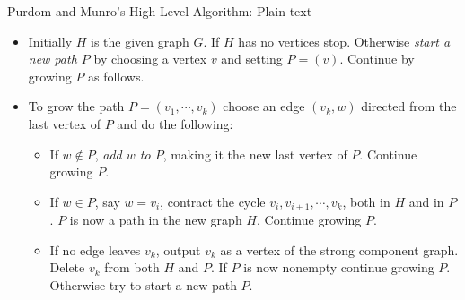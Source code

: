 \documentclass{beamer}
\begin{document}
\begin{frame}{Purdom and Munro's High-Level Algorithm: Plain text}
	\begin{itemize}
		\item
		Initially $H$ is the given graph $G$. If $H$ has no vertices stop. Otherwise \emph{start a new path $P$}
		by choosing a vertex $v$ and setting $P=(v)$. Continue by growing $P$ as follows.
		\item
		To grow the path $P=(v_1,\cdots ,v_k)$ choose an edge $(v_k,w)$ directed from the last
		vertex of $P$ and do the following:
		\begin{itemize}
			\item
			If $w\notin P$, \emph{add $w$ to $P$}, making it the new last vertex of $P$. Continue growing $P$.
			\item
			If $w\in P$, say $w=v_i$, contract the cycle $v_i, v_{i+1}, \cdots, v_k$, both in $H$
			and in $P$. $P$ is now a path in the new graph $H$. Continue growing $P$.
			\item
			If no edge leaves $v_k$, output $v_k$ as a vertex of the strong component graph. Delete $v_k$
			from both $H$ and $P$. If $P$ is now nonempty continue growing $P$. Otherwise try to start a
			new path $P$.
		\end{itemize}
	\end{itemize}
\end{frame}
\end{document}
